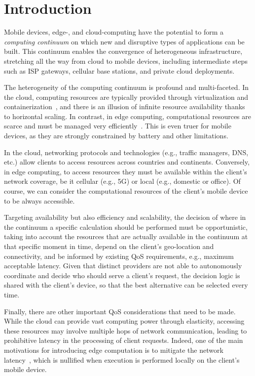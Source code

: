 \section{Introduction}
\label{sec:intro}

Mobile devices, edge-, and cloud-computing have the potential to form a \textit{computing continuum} on which new and disruptive types of applications can be built. This continuum enables the 
convergence of heterogeneous infrastructure, stretching all the way from cloud
to mobile devices, including intermediate steps such as ISP gateways, cellular base stations, and private cloud deployments.

The heterogeneity of the computing continuum is profound and multi-faceted. In the cloud, computing resources are typically provided through virtualization and containerization~\cite{leitner2016patterns, Quatrocchi2016discrete}, and there is an illusion of infinite resource availability thanks to horizontal scaling. In contrast, in edge computing, computational resources are scarce and must be managed very efficiently~\cite{Shi:2016, GarrigaMendonca2017}. This is even truer for mobile devices, as they are strongly constrained by battery and other limitations. 

In the cloud, networking protocols and technologies (e.g., traffic managers, DNS, etc.) allow clients to access resources across countries and continents. Conversely, in edge computing, to access resources they must be available within the client's network coverage, be it cellular (e.g., 5G) or local (e.g., domestic or office). Of course, we can consider the computational resources of the client's mobile device to be always accessible. %

Targeting availability but also efficiency and scalability, the decision of where in the continuum a specific calculation should be performed must be opportunistic, taking into account the resources that are actually available in the continuum at that specific moment in time, depend on the client's geo-location and connectivity, and be informed by existing QoS requirements, e.g., maximum acceptable latency. Given that distinct providers are not able to autonomously coordinate and decide who should serve a client's request, the decision logic is shared with the client's device, so that the best alternative can be selected every time.

Finally, there are other important QoS considerations that need to be made. While the cloud can provide vast computing power through elasticity, accessing these resources may involve multiple hops of network communication, leading to prohibitive latency in the processing of client requests. Indeed, one of the main motivations for introducing edge computation is to mitigate the network latency~\cite{Shi:2016}, which is nullified when execution is performed locally on the client's mobile device.

